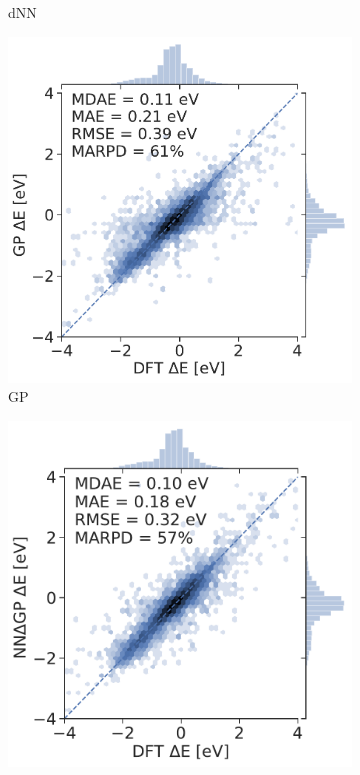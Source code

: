 \documentclass[]{achemso}
\begin{document}
\begin{figure}
\begin{subfigure}{0.32\textwidth}
        \caption{\gls{dNN}}\label{fig:parity_dnn}
    \end{subfigure}
    \begin{subfigure}{0.32\textwidth}
        \includegraphics[width=\textwidth]{../GP/Matern/parity.pdf}
        \caption{\gls{GP}}\label{fig:parity_gp}
    \end{subfigure}
    \begin{subfigure}{0.32\textwidth}
        \includegraphics[width=\textwidth]{../NNdGP/Matern/parity.pdf}

\end{subfigure}
\end{figure}
\end{document}
